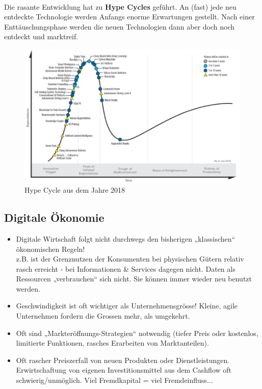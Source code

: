 \mbox{}\\
Die rasante Entwicklung hat zu \textbf{Hype Cycles} geführt. An (fast) jede
neu entdeckte Technologie werden Anfangs enorme Erwartungen gestellt.
Nach einer Enttäuschungsphase werden die neuen Technologien dann aber doch
noch entdeckt und marktreif.

\begin{figure}[H]
	\centering
	\includegraphics[width=.9\textwidth]{figures/hypeCycle2018.png}
	\caption{Hype Cycle aus dem Jahre 2018}
\end{figure}

\subsection{Digitale Ökonomie}

\begin{itemize}
	\tightlist
	\item Digitale Wirtschaft folgt nicht durchwegs den bisherigen „klassischen“
	ökonomischen Regeln!\\
	z.B. ist der Grenznutzen der Konsumenten bei physischen Gütern relativ rasch
	erreicht - bei	Informationen \& Services dagegen nicht. Daten als
	Ressourcen „verbrauchen“ sich nicht. Sie können immer wieder neu benutzt
	werden.
	\item Geschwindigkeit ist oft wichtiger als Unternehmensgrösse!
	Kleine, agile Unternehmen fordern die Grossen mehr, als umgekehrt.
	\item Oft sind „Markteröffnungs-Strategien“ notwendig (tiefer Preis oder
	kostenlos, limitierte Funktionen, rasches Erarbeiten von Marktanteilen).
	\item Oft rascher Preiszerfall von neuen Produkten oder Dienstleistungen.
	Erwirtschaftung von eigenen Investitionsmittel aus dem Cashflow oft
	schwierig/unmöglich. Viel Fremdkapital = viel Fremdeinfluss...
\end{itemize}


